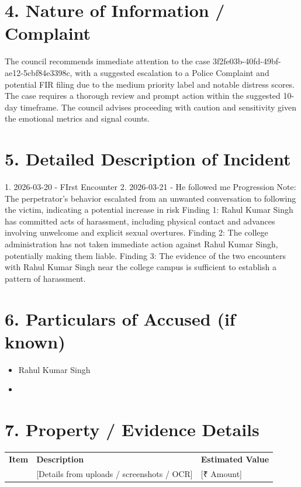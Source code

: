 \documentclass[11pt, a4paper]{article}
\begin{document}
\section{4. Nature of Information / Complaint}
The council recommends immediate attention to the case 3f2fe03b-40fd-49bf-ae12-5cbf84e3398c, with a suggested escalation to a Police Complaint and potential FIR filing due to the medium priority label and notable distress scores. The case requires a thorough review and prompt action within the suggested 10-day timeframe. The council advises proceeding with caution and sensitivity given the emotional metrics and signal counts.

\section{5. Detailed Description of Incident}
1. 2026-03-20 - FIrst Encounter
2. 2026-03-21 - He followed me
Progression Note: The perpetrator's behavior escalated from an unwanted conversation to following the victim, indicating a potential increase in risk
Finding 1: Rahul Kumar Singh has committed acts of harassment, including physical contact and advances involving unwelcome and explicit sexual overtures.
Finding 2: The college administration has not taken immediate action against Rahul Kumar Singh, potentially making them liable.
Finding 3: The evidence of the two encounters with Rahul Kumar Singh near the college campus is sufficient to establish a pattern of harassment.

\section{6. Particulars of Accused (if known)}
\begin{itemize}
  \item Rahul Kumar Singh
  \item [Address / Description]
\end{itemize}

\section{7. Property / Evidence Details}
\begin{tabular}{lll}
  \textbf{Item} & \textbf{Description} & \textbf{Estimated Value} \\
  [Evidence Item] & [Details from uploads / screenshots / OCR] & [₹ Amount] \\
\end{tabular}
\end{document}
